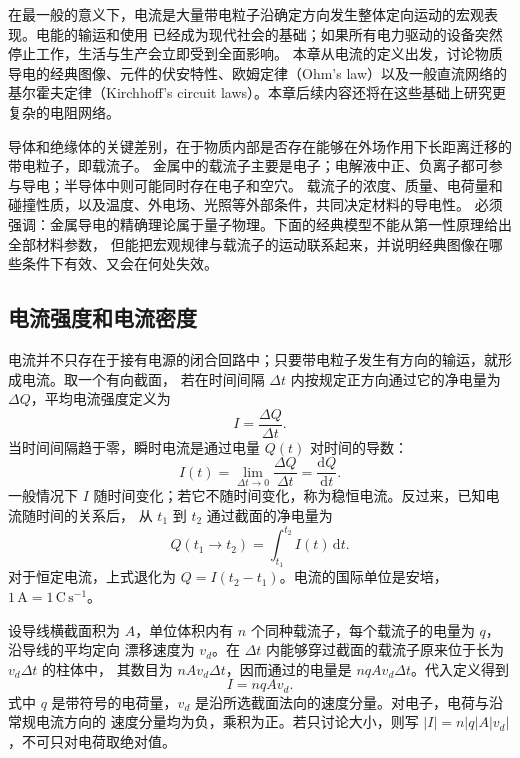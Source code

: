 {在最一般的意义下，电流是大量带电粒子沿确定方向发生整体定向运动的宏观表现。电能的输运和使用
已经成为现代社会的基础；如果所有电力驱动的设备突然停止工作，生活与生产会立即受到全面影响。
本章从电流的定义出发，讨论物质导电的经典图像、元件的伏安特性、欧姆定律（Ohm's law）以及一般直流网络的
基尔霍夫定律（Kirchhoff's circuit laws）。本章后续内容还将在这些基础上研究更复杂的电阻网络。

导体和绝缘体的关键差别，在于物质内部是否存在能够在外场作用下长距离迁移的带电粒子，即载流子。
金属中的载流子主要是电子；电解液中正、负离子都可参与导电；半导体中则可能同时存在电子和空穴。
载流子的浓度、质量、电荷量和碰撞性质，以及温度、外电场、光照等外部条件，共同决定材料的导电性。
必须强调：金属导电的精确理论属于量子物理。下面的经典模型不能从第一性原理给出全部材料参数，
但能把宏观规律与载流子的运动联系起来，并说明经典图像在哪些条件下有效、又会在何处失效。


\subsection{电流强度和电流密度}


电流并不只存在于接有电源的闭合回路中；只要带电粒子发生有方向的输运，就形成电流。取一个有向截面，
若在时间间隔 $\Delta t$ 内按规定正方向通过它的净电量为 $\Delta Q$，平均电流强度定义为
\begin{equation}
  \boxed{I=\frac{\Delta Q}{\Delta t}}.
\end{equation}
当时间间隔趋于零，瞬时电流是通过电量 $Q(t)$ 对时间的导数：
\begin{equation}
  \boxed{I(t)=\lim_{\Delta t\to0}\frac{\Delta Q}{\Delta t}
  =\frac{\mathrm dQ}{\mathrm dt}}.
\end{equation}
一般情况下 $I$ 随时间变化；若它不随时间变化，称为稳恒电流。反过来，已知电流随时间的关系后，
从 $t_1$ 到 $t_2$ 通过截面的净电量为
\begin{equation}
  \boxed{Q(t_1\to t_2)=\int_{t_1}^{t_2}I(t)\,\mathrm dt}.
\end{equation}
对于恒定电流，上式退化为 $Q=I(t_2-t_1)$。电流的国际单位是安培，
$1\,\mathrm A=1\,\mathrm C\,\mathrm s^{-1}$。

设导线横截面积为 $A$，单位体积内有 $n$ 个同种载流子，每个载流子的电量为 $q$，沿导线的平均定向
漂移速度为 $v_d$。在 $\Delta t$ 内能够穿过截面的载流子原来位于长为 $v_d\Delta t$ 的柱体中，
其数目为 $nAv_d\Delta t$，因而通过的电量是 $nqAv_d\Delta t$。代入定义得到
\begin{equation}
  \boxed{I=nqAv_d}.
\end{equation}
式中 $q$ 是带符号的电荷量，$v_d$ 是沿所选截面法向的速度分量。对电子，电荷与沿常规电流方向的
速度分量均为负，乘积为正。若只讨论大小，则写 $|I|=n|q|A|v_d|$，不可只对电荷取绝对值。

}
